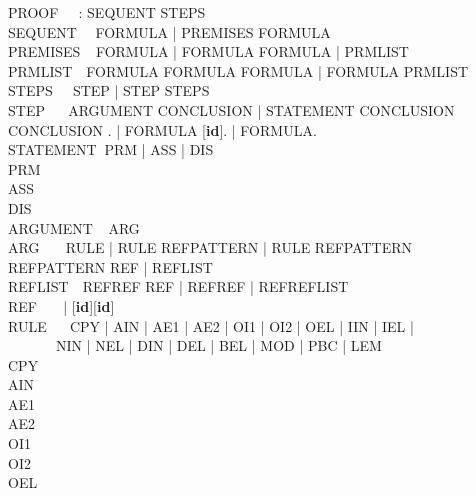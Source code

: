 \documentclass[BA.tex]{subfiles}
\begin{document}
\newcommand{\id}{{\bf id}}
{\ttfamily
\noindent
PROOF $~~~~~$\tra \id: SEQUENT STEPS\\
SEQUENT $~~~$\tra {} FORMULA | 
                   PREMISES FORMULA\\
PREMISES $~~$\tra {} FORMULA
                |  FORMULA  FORMULA
                |  PRMLIST\\
PRMLIST $~~~$\tra FORMULA\txt{, } FORMULA FORMULA 
                | FORMULA\txt{, } PRMLIST\\
STEPS $~~~~~$\tra STEP | STEP STEPS\\
STEP $~~~~~~$\tra ARGUMENT CONCLUSION | STATEMENT CONCLUSION\\
CONCLUSION   \tra [\id]. | FORMULA [\id]. | FORMULA.\\
STATEMENT $~$\tra PRM | ASS | DIS\\
PRM $~~~~~~~$\tra{}\\
ASS $~~~~~~~$\tra{}\\
DIS $~~~~~~~$\tra{}\\
ARGUMENT $~~$\tra{} ARG\\
ARG $~~~~~~~$\tra RULE | RULE REFPATTERN | RULE  REFPATTERN \\
REFPATTERN   \tra REF | REFLIST\\
REFLIST $~~~$\tra REF\txt{, }REF REF | REFREF |
                  REF\txt{, }REFLIST\\
REF $~~~~~~~$\tra [\id] | [\id]\txt{-}[\id]\\
RULE $~~~~~~$\tra CPY | AIN | AE1 | AE2 | OI1 | OI2 | OEL | IIN | IEL |\\
$~~~~~~~~~~~~~~$  NIN | NEL | DIN | DEL | BEL | MOD | PBC | LEM\\
CPY $~~~~~~~$\tra{}\\
AIN $~~~~~~~$\tra{}\\
AE1 $~~~~~~~$\tra{}\\
AE2 $~~~~~~~$\tra{}\\
OI1 $~~~~~~~$\tra{}\\
OI2 $~~~~~~~$\tra{}\\
OEL $~~~~~~~$\tra{}\\
}
\end{document}
